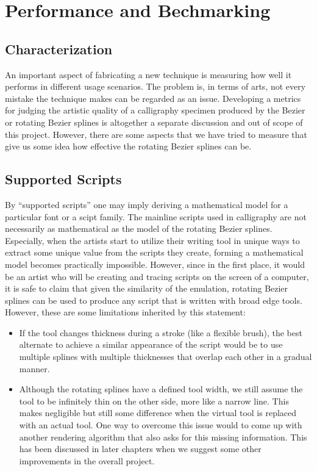 \section{Performance and Bechmarking}
\label{Chapter:Performance}

\subsection{Characterization}
An important aspect of fabricating a new technique is measuring how well it performs in different usage scenarios. The problem is, in terms of arts, not every mistake the technique makes can be regarded as an issue. Developing a metrics for judging the artistic quality of a calligraphy specimen produced by the Bezier or rotating Bezier splines is altogether a separate discussion and out of scope of this project. However, there are some aspects that we have tried to measure that give us some idea how effective the rotating Bezier splines can be.

\subsection{Supported Scripts}
By ``supported scripts'' one may imply deriving a mathematical model for a particular font or a scipt family. The mainline scripts used in calligraphy are not necessarily as mathematical as the model of the rotating Bezier splines. Especially, when the artists start to utilize their writing tool in unique ways to extract some unique value from the scripts they create, forming a mathematical model becomes practically impossible. However, since in the first place, it would be an artist who will be creating and tracing scripts on the screen of a computer, it is safe to claim that given the similarity of the emulation, rotating Bezier splines can be used to produce any script that is written with broad edge tools. However, these are some limitations inherited by this statement:

\begin{itemize}
\item If the tool changes thickness during a stroke (like a flexible brush), the best alternate to achieve a similar appearance of the script would be to use multiple splines with multiple thicknesses that overlap each other in a gradual manner.
\item Although the rotating splines have a defined tool width, we still assume the tool to be infinitely thin on the other side, more like a narrow line. This makes negligible but still some difference when the virtual tool is replaced with an actual tool. One way to overcome this issue would to come up with another rendering algorithm that also asks for this missing information. This has been discussed in later chapters when we suggest some other improvements in the overall project.
\end{itemize}
